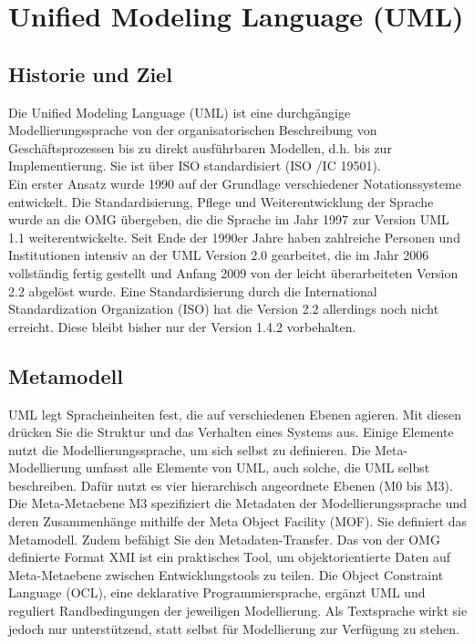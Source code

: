 
\section{Unified Modeling Language (UML)}

\subsection{Historie und Ziel}
Die Unified Modeling Language (UML) ist eine durchgängige Modellierungssprache von der
organisatorischen Beschreibung von Geschäftsprozessen bis zu direkt ausführbaren Modellen,
d.h. bis zur Implementierung. Sie ist über ISO standardisiert (ISO /IC 19501).\\
Ein erster Ansatz wurde 1990 auf der Grundlage verschiedener Notationssysteme entwickelt.
Die Standardisierung, Pflege und Weiterentwicklung der Sprache wurde an die OMG
übergeben, die die Sprache im Jahr 1997 zur Version UML 1.1 weiterentwickelte. Seit Ende der
1990er Jahre haben zahlreiche Personen und Institutionen intensiv an der UML Version 2.0
gearbeitet, die im Jahr 2006 vollständig fertig gestellt und Anfang 2009 von der leicht
überarbeiteten Version 2.2 abgelöst wurde. Eine Standardisierung durch die International
Standardization Organization (ISO) hat die Version 2.2 allerdings noch nicht erreicht. Diese
bleibt bisher nur der Version 1.4.2 vorbehalten.

\subsection{Metamodell}
UML legt Spracheinheiten fest, die auf verschiedenen Ebenen agieren. Mit diesen drücken Sie die Struktur und das Verhalten eines Systems aus. Einige Elemente nutzt die Modellierungssprache, um sich selbst zu definieren. Die Meta-Modellierung umfasst alle Elemente von UML, auch solche, die UML selbst beschreiben. Dafür nutzt es vier hierarchisch angeordnete Ebenen (M0 bis M3).\\

Die Meta-Metaebene M3 spezifiziert die Metadaten der Modellierungssprache und deren Zusammenhänge mithilfe der Meta Object Facility (MOF). Sie definiert das Metamodell. Zudem befähigt Sie den Metadaten-Transfer. Das von der OMG definierte Format XMI ist ein praktisches Tool, um objektorientierte Daten auf Meta-Metaebene zwischen Entwicklungstools zu teilen. Die Object Constraint Language (OCL), eine deklarative Programmiersprache, ergänzt UML und reguliert Randbedingungen der jeweiligen Modellierung. Als Textsprache wirkt sie jedoch nur unterstützend, statt selbst für Modellierung zur Verfügung zu stehen.\\

